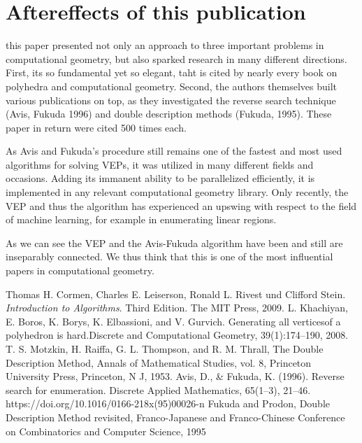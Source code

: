 \documentclass[a4paper, 11pt]{article}
\begin{document}
\section{Aftereffects of this publication}

this paper presented not only an approach to three important problems in computational geometry, but also sparked research in many different directions. First, its so fundamental yet so elegant, taht is cited by nearly every book on polyhedra and computational geometry. Second, the authors themselves built various publications on top, as they investigated the reverse search technique (Avis, Fukuda 1996)\cite{AvisReverseSearch} and double description methods (Fukuda, 1995)\cite{FukudaDoubleDescr}. These paper in return were cited 500 times each. \medskip
 
As Avis and Fukuda's procedure still remains one of the fastest and most used algorithms for solving VEPs, it was utilized in many different fields and occasions. Adding its immanent ability to be parallelized efficiently, it is implemented in any relevant computational geometry library. Only recently, the VEP and thus the algorithm has experienced an upswing with respect to the field of machine learning, for example in enumerating linear regions.\medskip

As we can see the VEP and the Avis-Fukuda algorithm have been and still are inseparably connected. We thus think that this is one of the most influential papers in computational geometry.


\newpage

\begin{thebibliography}{9}
	Thomas H. Cormen, Charles E. Leiserson, Ronald L. Rivest und Clifford Stein.
	\textit{Introduction to Algorithms}. Third Edition. The MIT Press, 2009.
	L. Khachiyan, E. Boros, K. Borys, K. Elbassioni, and V. Gurvich. Generating all
	verticesof a polyhedron is hard.Discrete and Computational Geometry,
	39(1):174–190, 2008.
	T. S. Motzkin, H. Raiffa, G. L. Thompson, and R. M. Thrall, The Double Description Method,
	Annals of Mathematical Studies, vol. 8, Princeton University Press, Princeton, N J, 1953.
	Avis, D., \& Fukuda, K. (1996). Reverse search for enumeration. Discrete Applied Mathematics, 65(1–3), 21–46. https://doi.org/10.1016/0166-218x(95)00026-n
	Fukuda and Prodon, Double Description Method revisited,  Franco-Japanese and Franco-Chinese Conference on Combinatorics and Computer Science, 1995
\end{thebibliography}
\end{document}
